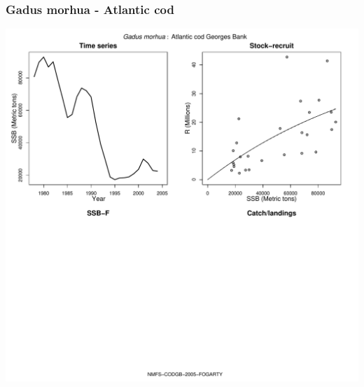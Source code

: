 \subsubsection{Gadus morhua - Atlantic cod}
\begin{center}
\includegraphics[width=1.2\textwidth]{../R/figures/NMFS-CODGB-2005-FOGARTY.pdf}
\end{center}

